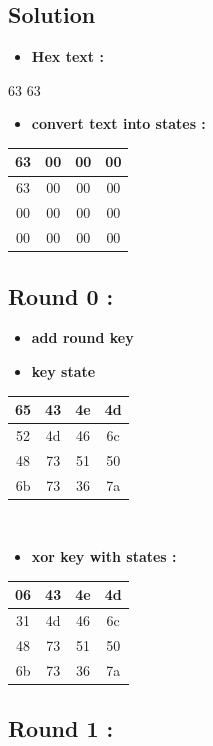 \documentclass{article}
\begin{document}
\subsection*{Solution}
\begin{itemize}
    \item \textbf{Hex text :}\\
\end{itemize}63 63 \begin{itemize}
    \item \textbf{convert text into states :}
\end{itemize}\begin{tabular}{|c|c|c|c|}
\hline 63 & 00 & 00 & 00 \\ \hline 63 & 00 & 00 & 00 \\ \hline 00 & 00 & 00 & 00 \\ \hline 00 & 00 & 00 & 00 \\ \hline \end{tabular}\hspace{0.5cm}\vspace{0.1cm}\subsection*{Round 0 : }\begin{itemize}
    \item \textbf{add round key} \\
\end{itemize}\begin{itemize}
    \item \textbf{key state} \\
\end{itemize}\begin{tabular}{|c|c|c|c|}
\hline 65 & 43 & 4e & 4d \\ \hline 52 & 4d & 46 & 6c \\ \hline 48 & 73 & 51 & 50 \\ \hline 6b & 73 & 36 & 7a \\ \hline \end{tabular}\hspace{0.5cm}\vspace{0.1cm}\\\begin{itemize}
    \item \textbf{xor key with states :}
\end{itemize}\begin{tabular}{|c|c|c|c|}
\hline 06 & 43 & 4e & 4d \\ \hline 31 & 4d & 46 & 6c \\ \hline 48 & 73 & 51 & 50 \\ \hline 6b & 73 & 36 & 7a \\ \hline \end{tabular}\hspace{0.5cm}\vspace{0.1cm}\subsection*{Round 1 : }\begin{itemize}

\end{itemize}
\end{document}
